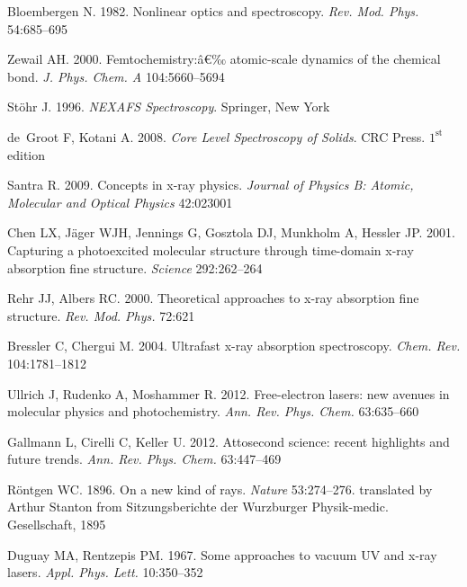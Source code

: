 \documentclass{ar-1col}
\begin{document}
\begin{thebibliography}{000}
Bloembergen N. 1982. Nonlinear optics and spectroscopy. \textit{Rev. Mod.
  Phys.} 54:685--695


Zewail AH. 2000. Femtochemistry:â€‰ atomic-scale dynamics of the chemical bond.
  \textit{J. Phys. Chem. A} 104:5660--5694

St\"{o}hr J. 1996. \textit{NEXAFS Spectroscopy}. Springer, New York

de~Groot F, Kotani A. 2008. \textit{Core Level Spectroscopy of Solids}. {CRC}
  Press. $1^{\textrm{st}}$ edition

Santra R. 2009. Concepts in x-ray physics. \textit{Journal of Physics B:
  Atomic, Molecular and Optical Physics} 42:023001

Chen LX, J\"{a}ger WJH, Jennings G, Gosztola DJ, Munkholm A, Hessler JP. 2001.
  Capturing a photoexcited molecular structure through time-domain x-ray
  absorption fine structure. \textit{Science} 292:262--264

Rehr JJ, Albers RC. 2000. Theoretical approaches to x-ray absorption fine
  structure. \textit{Rev. Mod. Phys.} 72:621

Bressler C, Chergui M. 2004. Ultrafast x-ray absorption spectroscopy.
  \textit{Chem. Rev.} 104:1781--1812

Ullrich J, Rudenko A, Moshammer R. 2012. {Free-electron} lasers: new avenues in
  molecular physics and photochemistry. \textit{Ann. Rev. Phys. Chem.}
  63:635--660

Gallmann L, Cirelli C, Keller U. 2012. Attosecond science: recent highlights
  and future trends. \textit{Ann. Rev. Phys. Chem.} 63:447--469

R\"{o}ntgen WC. 1896. On a new kind of rays. \textit{Nature} 53:274--276.
  translated by Arthur Stanton from Sitzungsberichte der Wurzburger
  Physik-medic. Gesellschaft, 1895

Duguay MA, Rentzepis PM. 1967. Some approaches to vacuum {UV} and x-ray lasers.
  \textit{Appl. Phys. Lett.} 10:350--352


\end{thebibliography}
\end{document}
